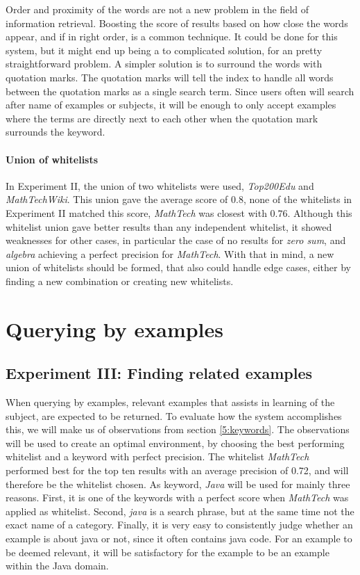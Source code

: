 Order and proximity of the words are not a new problem in the field of information retrieval. Boosting the score of results based on how close the words appear, and if in right order, is a common technique. It could be done for this system, but it might end up being a to complicated solution, for an pretty straightforward problem. A simpler solution is to surround the words with quotation marks. The quotation marks will tell the index to handle all words between the quotation marks as a single search term. Since users often will search after name of examples or subjects, it will be enough to only accept examples where the terms are directly next to each other when the quotation mark surrounds the keyword.

\paragraph{Union of whitelists}
In Experiment II, the union of two whitelists were used, \textit{Top200Edu} and \textit{MathTechWiki}. This union gave the average score of \(0.8\), none of the whitelists in Experiment II matched this score, \textit{MathTech} was closest with \(0.76\). Although this whitelist union gave better results than any independent whitelist, it showed weaknesses for other cases, in particular the case of no results for \textit{zero sum}, and \textit{algebra} achieving a perfect precision for \textit{MathTech}. With that in mind, a new union of whitelists should be formed, that also could handle edge cases, either by finding a new combination or creating new whitelists.


\section{Querying by examples} \label{5:queryByExample}

\subsection{Experiment III: Finding related examples}

When querying by examples, relevant examples that assists in learning of the subject, are expected to be returned. To evaluate how the system accomplishes this, we will make us of observations from section \ref{5:keywords}. The observations will be used to create an optimal environment, by choosing the best performing whitelist and a keyword with perfect precision. The whitelist \textit{MathTech} performed best for the top ten results with an average precision of 0.72, and will therefore be the whitelist chosen. As keyword, \textit{Java} will be used for mainly three reasons. First, it is one of the keywords with a perfect score when \textit{MathTech} was applied as whitelist. Second, \textit{java} is a search phrase, but at the same time not the exact name of a category. Finally, it is very easy to consistently judge whether an example is about java or not, since it often contains java code. For an example to be deemed relevant, it will be satisfactory for the example to be an example within the Java domain. 

